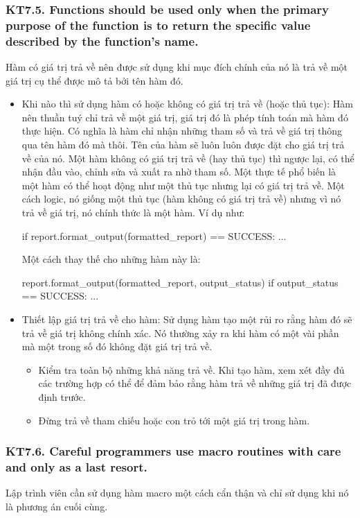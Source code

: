 \documentclass[12pt]{report}
\begin{document}
\subsubsection{KT7.5. Functions should be used only when the primary purpose of the function is to return the specific value described by the function's name.}
Hàm có giá trị trả về nên được sử dụng khi mục đích chính của nó là trả về một giá trị cụ thể được mô tả bởi tên hàm đó.
\vspace*{3mm}

\begin{itemize}
	\item Khi nào thì sử dụng hàm có hoặc không có giá trị trả về (hoặc thủ tục):
		Hàm nên thuần tuý chỉ trả về một giá trị, giá trị đó là phép tính toán mà hàm đó thực hiện. Có nghĩa là hàm chỉ nhận những tham số và trả về giá trị thông qua tên hàm đó mà thôi. Tên của hàm sẽ luôn luôn được đặt cho giá trị trả về của nó. Một hàm không có giá trị trả về (hay thủ tục) thì ngược lại, có thể nhận đầu vào, chỉnh sửa và xuất ra nhờ tham số. Một thực tế phổ biến là một hàm có thể hoạt động như một thủ tục nhưng lại có giá trị trả về. Một cách logic, nó giống một thủ tục (hàm không có giá trị trả về) nhưng vì nó trả về giá trị, nó chính thức là một hàm. Ví dụ như:
\begin{python}
if report.format_output(formatted_report) == SUCCESS:
	...
\end{python}
		Một cách thay thế cho những hàm này là:
\begin{python}
report.format_output(formatted_report, output_status)
if output_status == SUCCESS:
	...
\end{python}
	\item Thiết lập giá trị trả về cho hàm: Sử dụng hàm tạo một rủi ro rằng hàm đó sẽ trả về giá trị không chính xác. Nó thường xảy ra khi hàm có một vài phần mà một trong số đó không đặt giá trị trả về.
	\begin{itemize}
		\item Kiểm tra toàn bộ những khả năng trả về. Khi tạo hàm, xem xét đầy đủ các trường hợp có thể để đảm bảo rằng hàm trả về những giá trị đã được định trước. 
		\item Đừng trả về tham chiếu hoặc con trỏ tới một giá trị trong hàm. 
	\end{itemize}


\end{itemize} 

\subsubsection{KT7.6. Careful programmers use macro routines with care and only as a last resort.}
Lập trình viên cần sử dụng hàm macro một cách cẩn thận và chỉ sử dụng khi nó là phương án cuối cùng. 
\vspace*{3mm}
\end{document}
